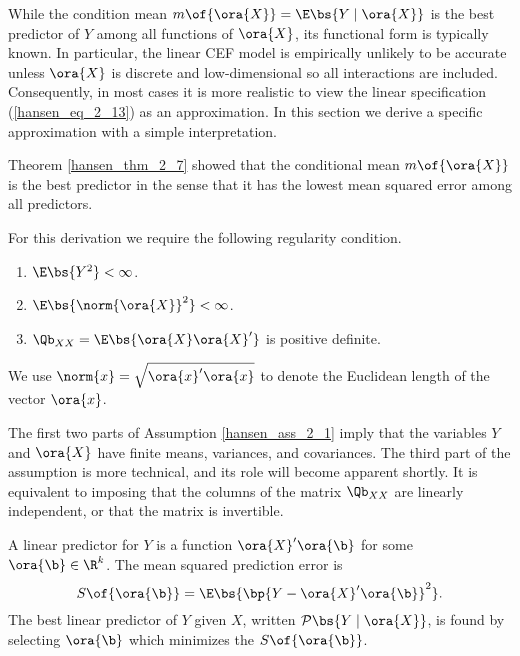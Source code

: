 While the condition mean $m\of{\ora{X}} = \E\bs{Y \mid \ora{X}}$ is the best predictor of $Y$ among all functions of $\ora{X}$, its functional form is typically known. In particular, the linear CEF model is empirically unlikely to be accurate unless $\ora{X}$ is discrete and low-dimensional so all interactions are included. Consequently, in most cases it is more realistic to view the linear specification (\ref{hansen_eq_2_13}) as an approximation. In this section we derive a specific approximation with a simple interpretation.

Theorem \ref{hansen_thm_2_7} showed that the conditional mean $m\of{\ora{X}}$ is the best predictor in the sense that it has the lowest mean squared error among all predictors. 

For this derivation we require the following regularity condition.

\begin{assumption} 
    \label{hansen_ass_2_1}
    \begin{enumerate}[topsep=0pt, leftmargin=20pt, itemsep=0pt, label=(\arabic*)]
        \setlength{\parskip}{10pt} 
        \item $\E\bs{Y^2} < \infty$.
        \item $\E\bs{\norm{\ora{X}}^2} < \infty$.
        \item $\Qb_{XX} = \E\bs{\ora{X}\ora{X}^\prime}$ is positive definite.
    \end{enumerate}
\end{assumption}
We use $\norm{x} = \sqrt{\ora{x}^\prime \ora{x}}$ to denote the Euclidean length of the vector $\ora{x}$.

The first two parts of Assumption \ref{hansen_ass_2_1} imply that the variables $Y$ and $\ora{X}$ have finite means, variances, and covariances. The third part of the assumption is more technical, and its role will become apparent shortly. It is equivalent to imposing that the columns of the matrix $\Qb_{XX}$ are linearly independent, or that the matrix is invertible.

A linear predictor for $Y$ is a function $\ora{X}^\prime \ora{\b}$ for some $\ora{\b} \in \R^k$. The mean squared prediction error is 
\begin{equation}
    \label{2.17}
    S\of{\ora{\b}} = \E\bs{\bp{Y - \ora{X}^\prime \ora{\b}}^2}.
\end{equation}
The best linear predictor of $Y$ given $X$, written $\mathcal{P}\bs{Y \mid \ora{X}}$, is found by selecting $\ora{\b}$ which minimizes the $S\of{\ora{\b}}$.

